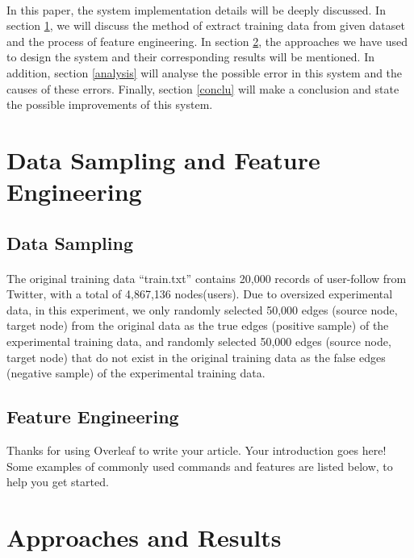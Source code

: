 \documentclass[fleqn,11pt]{olplainarticle}
\begin{document}
\paragraph*{}
In this paper, the system implementation details will be deeply discussed. In section \ref{datafeature}, we will discuss the method of extract training data from given dataset and the process of feature engineering. In section \ref{appres}, the approaches we have used to design the system and their corresponding results will be mentioned. In addition, section \ref{analysis} will analyse the possible error in this system and the causes of these errors. Finally, section \ref{conclu} will make a conclusion and state the possible improvements of this system.



\section{Data Sampling and Feature Engineering}\label{datafeature}

\subsection{Data Sampling}\label{data}
\paragraph*{}
The original training data “train.txt” contains 20,000 records of user-follow from Twitter, with a total of 4,867,136 nodes(users). Due to oversized experimental data, in this experiment, we only randomly selected 50,000 edges (source node, target node) from the original data as the true edges (positive sample) of the experimental training data, and randomly selected 50,000 edges (source node, target node)  that do not exist in the original training data as the false edges (negative sample) of the experimental training data. 

\subsection{Feature Engineering}\label{feature}
Thanks for using Overleaf to write your article. Your introduction goes here! Some examples of commonly used commands and features are listed below, to help you get started.

\section{Approaches and Results}\label{appres}
\end{document}

